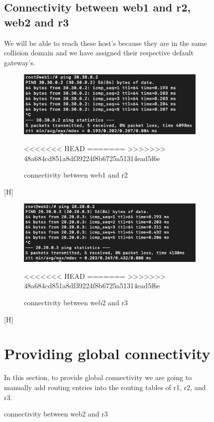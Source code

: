 \begin{figure}[H]
\subsection{Connectivity between web1 and r2, web2 and r3}
We will be able to reach these host's because they are in the same collision domain and we have assigned their respective default gateway's.
\begin{figure}[H]
\centering
  \includegraphics[width=400pt]{Images/Connectivity between web1 and r2.png}
  \caption{connectivity between web1 and r2}
<<<<<<< HEAD
  \label{fig:2.29}
=======
  \label{fig:3.1}
>>>>>>> 48a684cd851a8df39224f8b6725a51314ead5f6e
\end{figure} [H]
\begin{figure}[H]
\centering
  \includegraphics[width=400pt]{Images/Connectivity between web2 and r3.png}
  \caption{connectivity between web2 and r3}
<<<<<<< HEAD
  \label{fig:2.30}
=======
  \label{fig:3.1}
>>>>>>> 48a684cd851a8df39224f8b6725a51314ead5f6e
\end{figure} [H]

\section{Providing global connectivity}
In this section, to provide global connectivity we are going to manually add routing entries into the routing tables of r1, r2, and r3. 

\end{figure}

